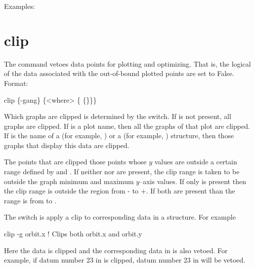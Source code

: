 Examples:


\section{clip}
\label{s:clip}

The  command vetoes data points for plotting and optimizing. That is, the
 logical of the data associated with the out-of-bound plotted points are set
to False.  Format:
\begin{example}
  clip \{-gang\} \{<where> \{<limit1> \{<limit2>\}\}\}
\end{example}

\vskip 10pt 

Which graphs are clipped is determined by the  switch. If  is not
present, all graphs are clipped. If  is a plot name, then all the graphs of that
plot are clipped. If  is the name of a  (for example, ) or
a  (for example, ) structure, then those graphs that display this
data are clipped.

The points that are clipped those points whose $y$ values are outside a certain range
defined by  and . If neither  nor  are
present, the clip range is taken to be outside the graph minimum and maximum $y$--axis
values. If only  is present then the clip range is outside the region from
- to +. If both are present than the range is from 
to .

The  switch is apply a clip to corresponding data in a  structure.
For example
\begin{example}
  clip -g orbit.x   ! Clips both orbit.x and orbit.y 
\end{example}
Here the  data is clipped and the corresponding data in  is also
vetoed. For example, if datum number 23 in  is clipped, datum number 23 in
 will be vetoed.

